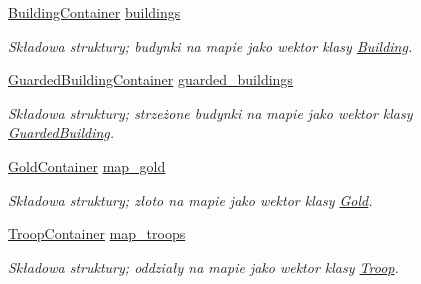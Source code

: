 \begin{DoxyCompactItemize}
\mbox{\label{structmodel_1_1GameState_abf5bb9d70022de2c70b5e575964d516d}} 
\hyperlink{building_8hpp_a73ce6a7004694882057ce332b6741811}{Building\+Container} \hyperlink{structmodel_1_1GameState_abf5bb9d70022de2c70b5e575964d516d}{buildings}
\begin{DoxyCompactList}\small\item\em Składowa struktury; budynki na mapie jako wektor klasy \hyperlink{classmodel_1_1Building}{Building}. \end{DoxyCompactList}\item 
\mbox{\label{structmodel_1_1GameState_a065ec91ab324eaf7e3a1bca69bb9fe68}} 
\hyperlink{guarded__building_8hpp_a4c05c1c79b1b5f3bbb54b04c990d53ce}{Guarded\+Building\+Container} \hyperlink{structmodel_1_1GameState_a065ec91ab324eaf7e3a1bca69bb9fe68}{guarded\+\_\+buildings}
\begin{DoxyCompactList}\small\item\em Składowa struktury; strzeżone budynki na mapie jako wektor klasy \hyperlink{classmodel_1_1GuardedBuilding}{Guarded\+Building}. \end{DoxyCompactList}\item 
\mbox{\label{structmodel_1_1GameState_a88fdf34d6fbb8cdc7bbbacd5a2732ce6}} 
\hyperlink{gold_8hpp_acc4c719f33d9505529826f5d8fe38836}{Gold\+Container} \hyperlink{structmodel_1_1GameState_a88fdf34d6fbb8cdc7bbbacd5a2732ce6}{map\+\_\+gold}
\begin{DoxyCompactList}\small\item\em Składowa struktury; złoto na mapie jako wektor klasy \hyperlink{classmodel_1_1Gold}{Gold}. \end{DoxyCompactList}\item 
\mbox{\label{structmodel_1_1GameState_aec56cde504fbd48e60a504d6441d1dae}} 
\hyperlink{troop_8hpp_a98a8449fdd332f3100611e4f42735f26}{Troop\+Container} \hyperlink{structmodel_1_1GameState_aec56cde504fbd48e60a504d6441d1dae}{map\+\_\+troops}
\begin{DoxyCompactList}\small\item\em Składowa struktury; oddziały na mapie jako wektor klasy \hyperlink{classmodel_1_1Troop}{Troop}. \end{DoxyCompactList}\end{DoxyCompactItemize}


